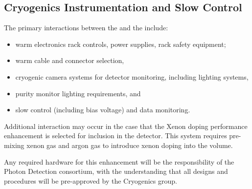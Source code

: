 
\subsection{Cryogenics Instrumentation and Slow Control}
\label{sec:fdsp-pd-intfc-xeon}

The primary interactions between the  and the  include:

\begin{itemize}
    \item warm electronics rack controls, power supplies, rack safety equipment;
    \item warm cable and connector selection,
    \item cryogenic camera systems for detector monitoring, including lighting systems,
    \item purity monitor lighting requirements, and 
    \item {} slow control (including bias voltage) and data monitoring.
\end{itemize}

Additional interaction may occur in the case that the Xenon doping performance enhancement is selected for inclusion in the detector.  This system requires pre-mixing xenon gas and argon gas to introduce xenon doping into the \lar volume. 


Any required hardware for this enhancement will be the responsibility of the Photon Detection consortium, with the understanding that all designs and procedures will be pre-approved by the Cryogenics group. 

